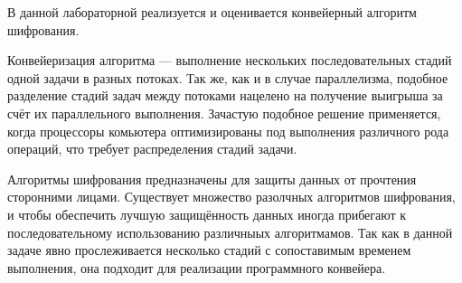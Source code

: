 В данной лабораторной реализуется и оценивается конвейерный алгоритм шифрования.

Конвейеризация алгоритма --- выполнение нескольких последовательных стадий одной задачи в разных потоках. Так же, как и в случае параллелизма, подобное разделение стадий задач между потоками нацелено на получение выигрыша за счёт их параллельного выполнения. Зачастую подобное решение применяется, когда процессоры комьютера оптимизированы под выполнения различного рода операций, что требует распределения стадий задачи.

Алгоритмы шифрования предназначены для защиты данных от прочтения сторонними лицами. Существует множество разолчных алгоритмов шифрования, и чтобы обеспечить лучшую защищённость данных иногда прибегают к последовательному использованию различныых алгоритмамов. Так как в данной задаче явно прослеживается несколько стадий с сопоставимым временем выполнения, она подходит для реализации программного конвейера.